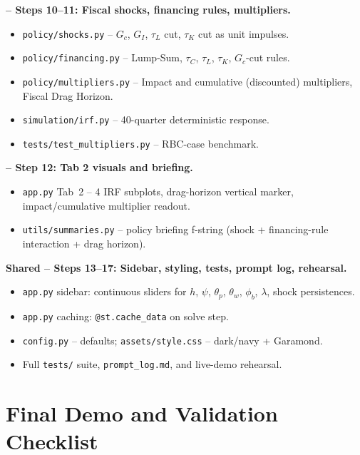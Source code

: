\documentclass[11pt]{article}
\newcommand{\nameblank}{\underline{\hspace{4.5cm}}}
\begin{document}
\begin{intuitbox}
\medskip
\textbf{\nameblank{} -- Steps 10--11: Fiscal shocks, financing rules, multipliers.}
\begin{itemize}
    \item \texttt{policy/shocks.py} -- $G_c$, $G_I$, $\tau_L$ cut, $\tau_K$ cut as unit impulses.
    \item \texttt{policy/financing.py} -- Lump-Sum, $\tau_C$, $\tau_L$, $\tau_K$, $G_c$-cut rules.
    \item \texttt{policy/multipliers.py} -- Impact and cumulative (discounted) multipliers, Fiscal Drag Horizon.
    \item \texttt{simulation/irf.py} -- 40-quarter deterministic response.
    \item \texttt{tests/test\_multipliers.py} -- RBC-case benchmark.
\end{itemize}

\medskip
\textbf{\nameblank{} -- Step 12: Tab 2 visuals and briefing.}
\begin{itemize}
    \item \texttt{app.py} Tab~2 -- 4 IRF subplots, drag-horizon vertical marker, impact/cumulative multiplier readout.
    \item \texttt{utils/summaries.py} -- policy briefing f-string (shock + financing-rule interaction + drag horizon).
\end{itemize}

\medskip
\textbf{Shared -- Steps 13--17: Sidebar, styling, tests, prompt log, rehearsal.}
\begin{itemize}
    \item \texttt{app.py} sidebar: continuous sliders for $h$, $\psi$, $\theta_p$, $\theta_w$, $\phi_b$, $\lambda$, shock persistences.
    \item \texttt{app.py} caching: \texttt{@st.cache\_data} on solve step.
    \item \texttt{config.py} -- defaults; \texttt{assets/style.css} -- dark/navy + Garamond.
    \item Full \texttt{tests/} suite, \texttt{prompt\_log.md}, and live-demo rehearsal.
\end{itemize}
\end{intuitbox}

\section{Final Demo and Validation Checklist}
\end{document}
